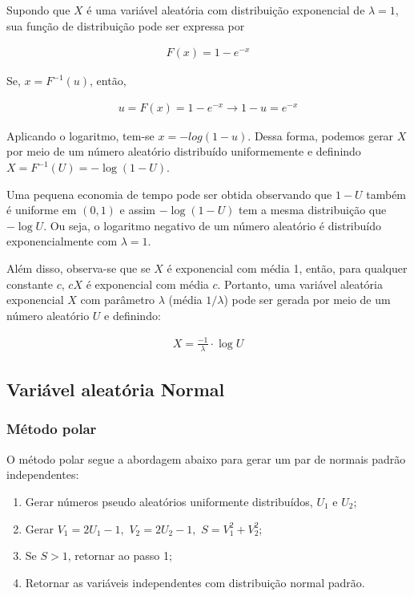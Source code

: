 \documentclass[
]{article}
\providecommand{\tightlist}{%
  \setlength{\itemsep}{0pt}\setlength{\parskip}{0pt}}
\begin{document}
Supondo que \(X\) é uma variável aleatória com distribuição exponencial
de \(\lambda = 1\), sua função de distribuição pode ser expressa por

\begin{align}
  F(x) = 1 - e^{-x}
\end{align}

Se, \(x = F^{-1}(u)\), então,

\begin{align}
  u = F(x) = 1 - e^{-x} \longrightarrow 1 - u = e^{-x}
\end{align}

Aplicando o logaritmo, tem-se \(x = - log(1 - u)\). Dessa forma, podemos
gerar \(X\) por meio de um número aleatório distribuído uniformemente e
definindo \(X = F^{-1}(U) = - \log(1 - U)\).

Uma pequena economia de tempo pode ser obtida observando que \(1 - U\)
também é uniforme em \((0, 1)\) e assim \(-\log(1 - U)\) tem a mesma
distribuição que \(-\log U\). Ou seja, o logaritmo negativo de um número
aleatório é distribuído exponencialmente com \(\lambda = 1\).

Além disso, observa-se que se \(X\) é exponencial com média 1, então,
para qualquer constante \(c\), \(cX\) é exponencial com média \(c\).
Portanto, uma variável aleatória exponencial \(X\) com parâmetro
\(\lambda\) (média \(1/\lambda\)) pode ser gerada por meio de um número
aleatório \(U\) e definindo:

\begin{align}
  X = \frac{-1}{\lambda} \cdot \log U
\end{align}

\newpage

\hypertarget{variuxe1vel-aleatuxf3ria-normal}{%
\subsection{Variável aleatória
Normal}\label{variuxe1vel-aleatuxf3ria-normal}}

\hypertarget{muxe9todo-polar}{%
\subsubsection{Método polar}\label{muxe9todo-polar}}

O método polar segue a abordagem abaixo para gerar um par de normais
padrão independentes:

\begin{enumerate}
\def\labelenumi{\arabic{enumi}.}
\tightlist
\item
  Gerar números pseudo aleatórios uniformente distribuídos, \(U_1\) e
  \(U_2\);
\item
  Gerar
  \(V_1 = 2 U_1 - 1, \, \, V_2 = 2 U_2 - 1, \,\, S = V_1^2 + V_2^2\);
\item
  Se \(S > 1\), retornar ao passo 1;
\item
  Retornar as variáveis independentes com distribuição normal padrão.
\end{enumerate}
\end{document}
